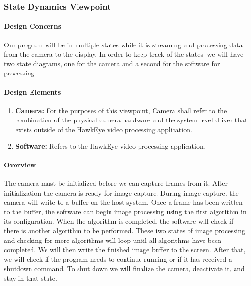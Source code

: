 \subsubsection{State Dynamics Viewpoint}
	\paragraph{Design Concerns}
	Our program will be in multiple states while it is streaming and processing data from the camera to the display. In order to keep track of the states, we will have two state diagrams, one for the camera and a second for the software for processing.\\
	
	\paragraph{Design Elements}
	
	\begin{enumerate}[leftmargin=2cm,labelindent=2cm]
	\item \textbf{Camera:}
	For the purposes of this viewpoint, Camera shall refer to the combination of the physical camera hardware and the system level driver that exists 	outside of the HawkEye video processing application.

	\item \textbf{Software:}
	Refers to the HawkEye video processing application.\\
	\end{enumerate}
	
	\paragraph{Overview}
	The camera must be initialized before we can capture frames from it. After initialization the camera is ready for image capture. During image capture, the camera will write to a buffer on the host system. Once a frame has been written to the buffer, the software can begin image processing using the first algorithm in its configuration. When the algorithm is completed, the software will check if there is another algorithm to be performed. These two states of image processing and checking for more algorithms will loop until all algorithms have been completed. We will then write the finished image buffer to the screen. After that, we will check if the program needs to continue running or if it has received a shutdown command. To shut down we will finalize the camera, deactivate it, and stay in that state. \\
